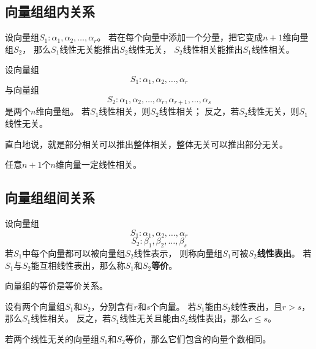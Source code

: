 \subsection{向量组组内关系}
\begin{theorem}[接长与补短]
  设向量组$S_1: \alpha_1,\alpha_2,\dots,\alpha_r$。
  若在每个向量中添加一个分量，把它变成$n+1$维向量组$S_2$，
  那么$S_1$线性无关能推出$S_2$线性无关，
  $S_2$线性相关能推出$S_1$线性相关。
\end{theorem}

\begin{theorem}[部分与整体]
  设向量组
  \[ S_1: \alpha_1,\alpha_2,\dots,\alpha_r \]
  与向量组
  \[ S_2: \alpha_1,\alpha_2,\dots,\alpha_r,\alpha_{r+1},\dots,\alpha_s \]
  是两个$n$维向量组。
  若$S_1$线性相关，则$S_2$线性相关；
  反之，若$S_2$线性无关，则$S_1$线性无关。
\end{theorem}

\begin{remark}
  直白地说，就是部分相关可以推出整体相关，整体无关可以推出部分无关。
\end{remark}

\begin{theorem}
  任意$n+1$个$n$维向量一定线性相关。
\end{theorem}

\subsection{向量组组间关系}
\begin{definition}[向量组等价]
  设向量组
  \[ S_1: \alpha_1,\alpha_2,\dots,\alpha_r \]
  \[ S_2: \beta_1,\beta_2,\dots,\beta_s \]
  若$S_1$中每个向量都可以被向量组$S_2$线性表示，
  则称向量组$S_1$可被$S_2$\textbf{线性表出}。
  若$S_1$与$S_2$能互相线性表出，那么称$S_1$和$S_2$\textbf{等价}。
\end{definition}

\begin{remark}
  向量组的等价是等价关系。
\end{remark}

\begin{theorem} \label{thrm-vector-set-size}
  设有两个向量组$S_1$和$S_2$，分别含有$r$和$s$个向量。
  若$S_1$能由$S_2$线性表出，且$r > s$，那么$S_1$线性相关。
  反之，若$S_1$线性无关且能由$S_2$线性表出，那么$r \le s$。
\end{theorem}

\begin{corollary} \label{thrm-vector-set-equiv}
  若两个线性无关的向量组$S_1$和$S_2$等价，那么它们包含的向量个数相同。
\end{corollary}

